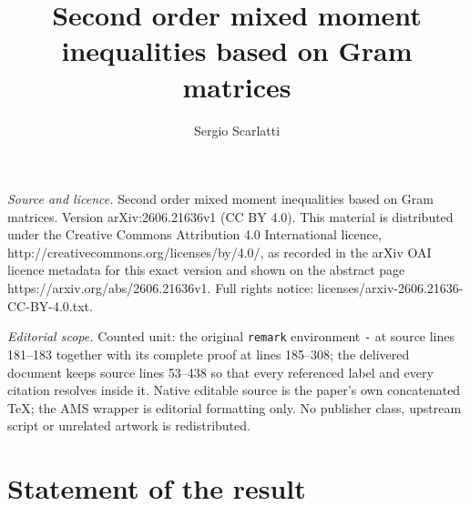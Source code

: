 \documentclass[10pt,a4paper]{amsart}
\begin{document}
\title[Second order mixed moment inequalities based on Gram matrice]{Second order mixed moment inequalities based on Gram matrices}
\author{Sergio Scarlatti}
\date{}
\maketitle
\noindent\emph{Source and licence.} Second order mixed moment inequalities based on Gram matrices. Version arXiv:2606.21636v1 (CC BY 4.0). This material is distributed under the Creative Commons Attribution 4.0 International licence, http://creativecommons.org/licenses/by/4.0/, as recorded in the arXiv OAI licence metadata for this exact version and shown on the abstract page https://arxiv.org/abs/2606.21636v1. Full rights notice: licenses/arxiv-2606.21636-CC-BY-4.0.txt.\par\smallskip
\noindent\textit{Editorial scope.} Counted unit: the original \texttt{remark} environment \texttt{-} at source lines 181--183 together with its complete proof at lines 185--308; the delivered document keeps source lines 53--438 so that every referenced label and every citation resolves inside it. Native editable source is the paper's own concatenated TeX; the AMS wrapper is editorial formatting only. No publisher class, upstream script or unrelated artwork is redistributed.
\section{Statement of the result}
\end{document}
